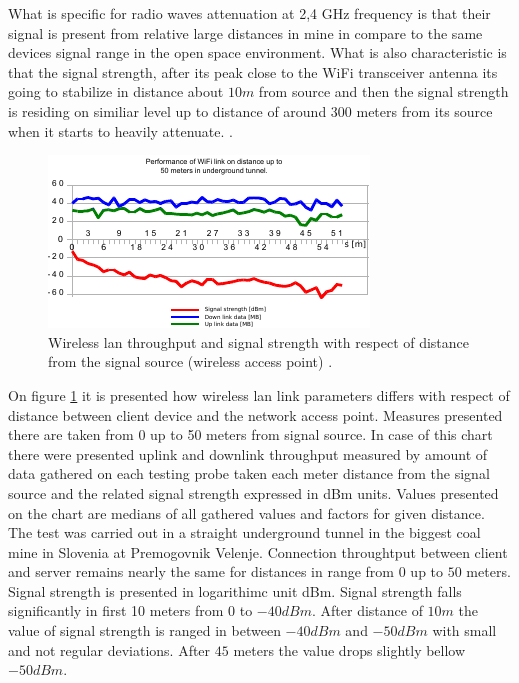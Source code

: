 \documentclass[../main.tex]{subfiles}
\begin{document}
What is specific for radio waves attenuation at 2,4 GHz frequency is that their signal is present from relative large distances in mine in compare to the same devices signal range in the open space environment. What is also characteristic is that the signal strength, after its peak close to the WiFi transceiver antenna its going to stabilize in distance about $10m$ from source and then the signal strength is residing on similiar level up to distance of around $300$ meters from its source when it starts to heavily attenuate. \cite{Thesis_CM}.

\begin{figure}[!htbp]
\includegraphics[width=\textwidth]{pictures/wifi_link_short.pdf}
\centering
\caption{Wireless lan throughput and signal strength with respect of distance from the signal source (wireless access point) \cite{Thesis_CM}. }
\label{fig:wifi_link_short}
\end{figure}


On figure \ref{fig:wifi_link_short} it is presented how wireless lan link parameters differs with respect of distance between client device and the network access point. Measures presented there are taken from 0 up to 50 meters from signal source. In case of this chart there were presented uplink and downlink throughput measured by amount of data gathered on each testing probe taken each meter distance from the signal source and the related signal strength expressed in dBm units. Values presented on the chart are medians of all gathered values and factors for given distance. The test was carried out in a straight underground tunnel in the biggest coal mine in Slovenia at Premogovnik Velenje. Connection throughtput between client and server remains nearly the same for distances in range from $0$ up to $50$ meters. Signal strength is presented in logarithimc unit dBm. Signal strength falls significantly in first 10 meters from $0$ to $-40 dBm$. After distance of $10m$ the value of signal strength is ranged in between $-40 dBm$ and $-50 dBm$ with small and not regular deviations. After $45$ meters the value drops slightly bellow $-50 dBm$.
\end{document}
